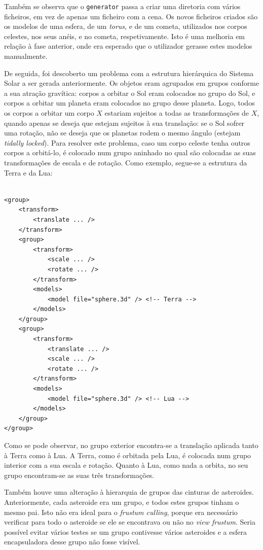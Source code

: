 \documentclass[12pt, a4paper]{article}
\begin{document}
Também se observa que o \texttt{generator} passa a criar uma diretoria com vários ficheiros, em vez
de apenas um ficheiro com a cena. Os novos ficheiros criados são os modelos de uma esfera, de um
\emph{torus}, e de um cometa, utilizados nos corpos celestes, nos seus anéis, e no cometa,
respetivamente. Isto é uma melhoria em relação à fase anterior, onde era esperado que o utilizador
gerasse estes modelos manualmente.

De seguida, foi descoberto um problema com a estrutura hierárquica do Sistema Solar a ser gerada
anteriormente. Os objetos eram agrupados em grupos conforme a sua atração gravítica: corpos a
orbitar o Sol eram colocados no grupo do Sol, e corpos a orbitar um planeta eram colocados no grupo
desse planeta. Logo, todos os corpos a orbitar um corpo $X$ estariam sujeitos a todas as
transformações de $X$, quando apenas se deseja que estejam sujeitos à sua translação: se o Sol
sofrer uma rotação, não se deseja que os planetas rodem o mesmo ângulo (estejam
\emph{tidally locked}). Para resolver este problema, caso um corpo celeste tenha outros corpos a
orbitá-lo, é colocado num grupo aninhado no qual são colocadas as suas transformações de escala e de
rotação. Como exemplo, segue-se a estrutura da Terra e da Lua:

\lstset{language=xml}
\begin{lstlisting}

<group>
    <transform>
        <translate ... />
    </transform>
    <group>
        <transform>
            <scale ... />
            <rotate ... />
        </transform>
        <models>
            <model file="sphere.3d" /> <!-- Terra -->
        </models>
    </group>
    <group>
        <transform>
            <translate ... />
            <scale ... />
            <rotate ... />
        </transform>
        <models>
            <model file="sphere.3d" /> <!-- Lua -->
        </models>
    </group>
</group>
\end{lstlisting}

Como se pode observar, no grupo exterior encontra-se a translação aplicada tanto à Terra como à Lua.
A Terra, como é orbitada pela Lua, é colocada num grupo interior com a sua escala e rotação. Quanto
à Lua, como nada a orbita, no seu grupo encontram-se as suas três transformações.

Também houve uma alteração à hierarquia de grupos das cinturas de asteroides. Anteriormente, cada
asteroide era um grupo, e todos estes grupos tinham o mesmo pai. Isto não era ideal para o
\emph{frustum culling}, porque era necessário verificar para todo o asteroide se ele se encontrava
ou não no \emph{view frustum}. Seria possível evitar vários testes se um grupo contivesse vários
asteroides e a esfera encapsuladora desse grupo não fosse visível.
\end{document}
